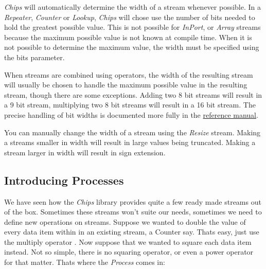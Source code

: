 \documentclass[letterpaper,10pt,english]{manual}
\begin{document}
\emph{Chips} will automatically determine the width of a stream whenever possible.
In a \emph{Repeater}, \emph{Counter} or \emph{Lookup}, \emph{Chips} will chose use the number of
bits needed to hold the greatest possible value. This is not possible for
\emph{InPort}, or \emph{Array} streams because the maximum possible value is not known at
compile time. When it is not possible to determine the maximum value, the width
must be specified using the bits parameter.

When streams are combined using operators, the width of the resulting stream
will usually be chosen to handle the maximum possible value in the resulting
stream, though there are some exceptions. Adding two 8 bit streams will result
in a 9 bit stream, multiplying two 8 bit streams will result in a 16 bit
stream. The precise handling of bit widths is documented more  fully in the
\href{http://dawsonjon.github.com/chips/language\_reference/}{reference manual}.

You can manually change the width of a stream using the \emph{Resize} stream. Making
a streams smaller in width will result in large values being truncated. Making
a stream larger in width will result in sign extension.
\begin{quote}
\end{quote}


\subsection{Introducing Processes}

We have seen how the \emph{Chips} library provides quite a few ready made streams
out of the box. Sometimes these streams won't suite our needs, sometimes we
need to define new operations on streams. Suppose we wanted to double the value
of every data item within in an existing stream, a Counter say. Thats easy,
just use the multiply operator . Now suppose that we
wanted to square each data item instead. Not so simple, there is no squaring
operator, or even a power operator for that matter. Thats where the \emph{Process}
comes in:
\end{document}
